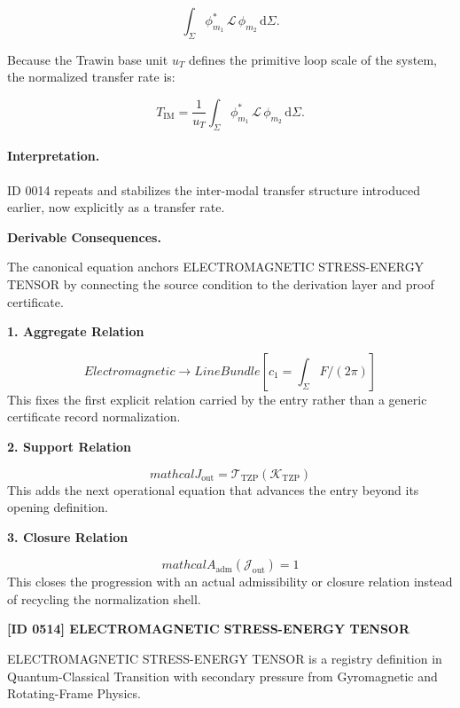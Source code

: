 \begin{equation}
\int_{\Sigma}
\phi_{m_1}^{*}
\,\mathcal{L}\,
\phi_{m_2}
\,\mathrm{d}\Sigma .
\end{equation}

Because the Trawin base unit $u_T$ defines the primitive loop scale of the system, the normalized transfer rate is:

\begin{equation}
\boxed{
T_{\mathrm{IM}}
=
\frac{1}{u_T}
\int_{\Sigma}
\phi_{m_1}^{*}
\,\mathcal{L}\,
\phi_{m_2}
\,\mathrm{d}\Sigma .
}
\end{equation}

\paragraph{Interpretation.}
ID 0014 repeats and stabilizes the inter-modal transfer structure introduced earlier, now explicitly as a transfer rate.

\par\vspace{0.35em}
\noindent\textbf{Derivable Consequences.}\quad
\begingroup
\footnotesize
\raggedright
The canonical equation anchors ELECTROMAGNETIC STRESS-ENERGY TENSOR by connecting the source condition to the derivation layer and proof certificate.
\par\endgroup

\noindent\textbf{1. Aggregate Relation}\par
\[
Electromagnetic \to LineBundle[c_1 = \int_\Sigma F/(2\pi)]
\]
\noindent This fixes the first explicit relation carried by the entry rather than a generic certificate record normalization.\par
\noindent\textbf{2. Support Relation}\par
\[
mathcal{J}_{\mathrm{out}} = \mathcal{T}_{\mathrm{TZP}}\!\left(\mathcal{K}_{\mathrm{TZP}}\right)
\]
\noindent This adds the next operational equation that advances the entry beyond its opening definition.\par
\noindent\textbf{3. Closure Relation}\par
\[
mathcal{A}_{\mathrm{adm}}\!\left(\mathcal{J}_{\mathrm{out}}\right)=1
\]
\noindent This closes the progression with an actual admissibility or closure relation instead of recycling the normalization shell.\par

\clearpage
\noindent\textbf{[ID 0514] ELECTROMAGNETIC STRESS-ENERGY TENSOR}\par
\vspace{0.35em}
\begingroup\small
{}
ELECTROMAGNETIC STRESS-ENERGY TENSOR is a registry definition in Quantum-Classical Transition with secondary pressure from Gyromagnetic and Rotating-Frame Physics.

